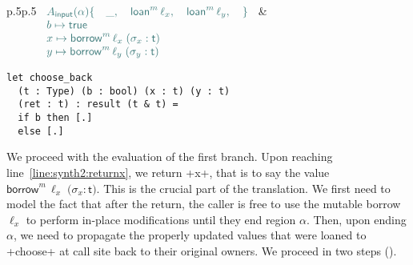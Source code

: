 \documentclass[acmsmall,screen]{acmart}
\newcommand{\Rule}[1]{\hyperlink{#1}{\TirName {#1}}}
\newcommand\kw[1]{\ensuremath{\mathsf{#1}}}
\newcommand\emborrow[2]{\ensuremath{\mathsf{borrow}^m\,#1\;#2}}
\newcommand\emloan[1]{\ensuremath{\mathsf{loan}^m\,#1}}
\begin{document}
\medskip
\noindent
\begin{tabular}{p{}p{}}
\small
$
\color{envcolor}
\begin{array}[t]{l}
  A_\mathsf{input}(\alpha) \{
    \quad \_,
    \quad \emloan \ell_x,
    \quad \emloan \ell_y,
  \quad \}\\
  b \mapsto \mathsf{true} \quad\\
  x \mapsto \emborrow{\ell_x} (\sigma_x : \kw{t}) \quad\\
  y \mapsto \emborrow{\ell_y} (\sigma_y : \kw{t}) \quad\\
\end{array}
$
\normalsize
&
\begin{minipage}[t]{0.5\textwidth}
\begin{verbatim}
let choose_back
  (t : Type) (b : bool) (x : t) (y : t)
  (ret : t) : result (t & t) =
  if b then [.]
  else [.]
\end{verbatim}
\end{minipage}
\end{tabular}

\medskip
\noindent
We proceed with the evaluation of the first branch. Upon reaching
line~\ref{line:synth2:returnx}, we return \li+x+, that is to say the value
$\emborrow{\ell_x} (\sigma_x : \kw{t})$. This is the crucial part of the translation.
We first need to model the fact that after the return, the caller is free to use the
mutable borrow $\ell_x$ to perform in-place modifications until they end
region $\alpha$. Then, upon ending $\alpha$, we need to propagate the properly
updated values that were loaned to \li+choose+ at call site back to their original owners.
We proceed in two steps (\Rule{T-Return-Backward}).
\end{document}

